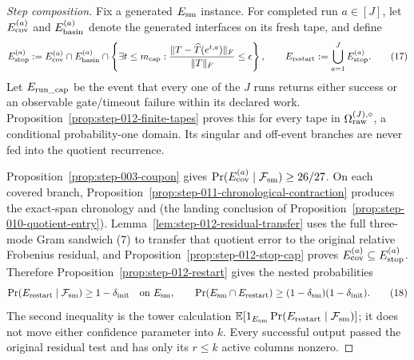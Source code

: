 \begin{proof}[Step composition]
Fix a generated \(E_{\rm sm}\) instance.  For completed run
\(a\in[J]\), let \(E_{\rm cov}^{(a)}\) and \(E_{\rm basin}^{(a)}\) denote
the generated interfaces on its fresh tape, and define
\[
 E_{\rm stop}^{(a)}:=E_{\rm cov}^{(a)}\cap E_{\rm basin}^{(a)}\cap
 \left\{\exists t\le m_{\rm cap}:
 {\|T-\widehat T(e^{t,a})\|_F\over\|T\|_F}\le\epsilon\right\},
 \qquad
 E_{\rm restart}:=\bigcup_{a=1}^J E_{\rm stop}^{(a)}.
\tag{17}
\]
Let \(E_{\rm run\_cap}\) be the event that every one of the \(J\) runs
returns either success or an observable gate/timeout failure within its
declared work.  Proposition~\ref{prop:step-012-finite-tapes} proves this for
every tape in \(\Omega_{\rm raw}^{(J),\circ}\), a conditional
probability-one domain.  Its singular and off-event branches are never fed
into the quotient recurrence.

Proposition~\ref{prop:step-003-coupon} gives
\(\Pr(E_{\rm cov}^{(a)}\mid{\cal F}_{\rm sm})\ge26/27\).  On each covered
branch, Proposition~\ref{prop:step-011-chronological-contraction} produces
the exact-span chronology and (the landing conclusion of Proposition~\ref{prop:step-010-quotient-entry}).  Lemma~\ref{lem:step-012-residual-transfer}
uses the full three-mode Gram sandwich (7) to transfer that quotient error to
the original relative Frobenius residual, and
Proposition~\ref{prop:step-012-stop-cap} proves
\(E_{\rm cov}^{(a)}\subseteq E_{\rm stop}^{(a)}\).  Therefore
Proposition~\ref{prop:step-012-restart} gives the nested probabilities
\[
 \Pr(E_{\rm restart}\mid{\cal F}_{\rm sm})\ge1-\delta_{\rm init}
 \quad\text{on }E_{\rm sm},
 \qquad
 \Pr(E_{\rm sm}\cap E_{\rm restart})
 \ge(1-\delta_{\rm sm})(1-\delta_{\rm init}).
\tag{18}
\]
The second inequality is the tower calculation
\(\mathbb E[1_{E_{\rm sm}}
\Pr(E_{\rm restart}\mid{\cal F}_{\rm sm})]\); it does not move either
confidence parameter into \(k\).  Every successful output passed the original
residual test and has only its \(r\le k\) active columns nonzero.


\end{proof}
